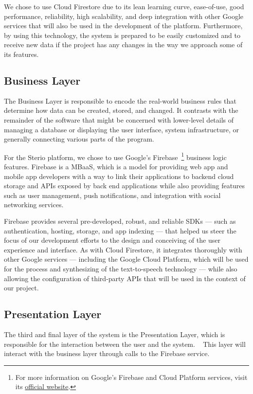 We chose to use Cloud Firestore due to its lean learning curve, ease-of-use, good performance, reliability, high scalability, and deep integration with other Google services that will also be used in the development of the platform. Furthermore, by using this technology, the system is prepared to be easily customized and to receive new data if the project has any changes in the way we approach some of its features.


\subsection{Business Layer}

The Business Layer is responsible to encode the real-world business rules that determine how data can be created, stored, and changed. It contrasts with the remainder of the software that might be concerned with lower-level details of managing a database or displaying the user interface, system infrastructure, or generally connecting various parts of the program. ~\cite{Aarsten}

For the Sterio platform, we chose to use Google's Firebase~\footnote{For more information on Google's Firebase and Cloud Platform services, visit its \href{https://firebase.google.com/}{official website}.} business logic features. Firebase is a \ac{MBaaS}, which is a model for providing web app and mobile app developers with a way to link their applications to backend cloud storage and \acp{API} exposed by back end applications while also providing features such as user management, push notifications, and integration with social networking services.

Firebase provides several pre-developed, robust, and reliable \acp{SDK} — such as authentication, hosting, storage, and app indexing — that helped us steer the focus of our development efforts to the design and conceiving of the user experience and interface. As with Cloud Firestore, it integrates thoroughly with other Google services — including the Google Cloud Platform, which will be used for the process and synthesizing of the text-to-speech technology — while also allowing the configuration of third-party \acp{API} that will be used in the context of our project.

\subsection{Presentation Layer}

The third and final layer of the system is the Presentation Layer, which is responsible for the interaction between the user and the system. ~\cite{Aarsten} This layer will interact with the business layer through calls to the Firebase service.

